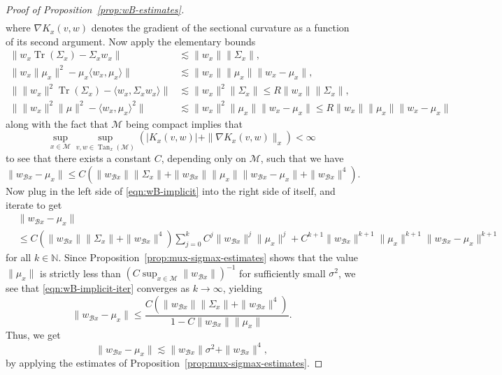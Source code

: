 \documentclass[preprint]{imsart}
\theoremstyle{plain}
\theoremstyle{definition}
\newcommand{\Nbb}{\mathbb{N}}
\newcommand{\Mcal}{\mathcal{M}}
\newcommand{\trace}{\operatorname{Tr}}
\DeclareMathOperator{\Tan}{Tan}
\newcommand{\B}{\mathcal{B}}
\begin{document}
\begin{appendix}
\begin{proof}[Proof of Proposition~\ref{prop:wB-estimates}]
\begin{align*}
    \end{align*}
    where $\nabla K_x(v,w)$ denotes the gradient of the sectional curvature as a function of its second argument.
    Now apply the elementary bounds
    \begin{align*}
        \bigg\|w_x\trace(\Sigma_x) - \Sigma_x w_x\bigg\| &\lesssim \|w_x\|\|\Sigma_x\|, \\
        \bigg\|w_x\|\mu_x\|^2 - \mu_x\langle w_x,\mu_x\rangle\bigg\| &\lesssim \|w_x\|\|\mu_x\|\|w_x-\mu_x\|, \\
        \bigg\|\|w_x\|^2\trace(\Sigma_x) - \langle w_x,\Sigma_x w_x\rangle\bigg\| &\lesssim \|w_x\|^2\|\Sigma_x\| \le R\|w_x\|\|\Sigma_x\|, \\
        \bigg\|\|w_x\|^2\|\mu\|^2-\langle w_x,\mu_x\rangle^2\bigg\| &\lesssim \|w_x\|^2\|\mu_x\|\|w_x-\mu_x\| \le R\|w_x\|\|\mu_x\|\|w_x-\mu_x\| 
    \end{align*}
    along with the fact that $\Mcal$ being compact implies that
    \begin{equation*}
        \sup_{x\in\Mcal}\sup_{v,w\in\Tan_x(\Mcal)}\left(|K_x(v,w)| + \|\nabla K_x(v,w)\|_x\right) <\infty
    \end{equation*}
    to see that there exists a constant $C$, depending only on $\Mcal$, such that we have
    \begin{equation}\label{eqn:wB-implicit}
        \|w_{\B x}-\mu_x\| \le C\left(\|w_{\B x}\|\|\Sigma_x\| + \|w_{\B x}\| \|\mu_x\|\|w_{\B x} - \mu_x\| + \|w_{\B x}\|^4\right).
    \end{equation}
    Now plug in the left side of \eqref{eqn:wB-implicit} into the right side of itself, and iterate to get
    \begin{equation}\label{eqn:wB-implicit-iter}
        \begin{split}
            &\|w_{\B x}-\mu_x\| \\
            &\le C\left(\|w_{\B x}\|\|\Sigma_x\|+\|w_{\B x}\|^4\right)\sum_{j=0}^{k}C^j\|w_{\B x}\|^j\|\mu_x\|^j+ C^{k+1}\|w_{\B x}\|^{k+1}\|\mu_x\|^{k+1} \|w_{\B x}-\mu_x\|^{k+1}
        \end{split}
    \end{equation}
    for all $k\in\Nbb$.
    Since Proposition~\ref{prop:mux-sigmax-estimates} shows that the value $\|\mu_x\|$ is strictly less than $(C\sup_{x\in\Mcal}\|w_{\B x}\|)^{-1}$ for sufficiently small $\sigma^2$, we see that \eqref{eqn:wB-implicit-iter} converges as $k\to\infty$, yielding
    \begin{equation*}
        \|w_{\B x}-\mu_x\| \le \frac{C\left(\|w_{\B x}\|\|\Sigma_x\| + \|w_{\B x}\|^4\right)}{1-C\|w_{\B x}\|\|\mu_x\|}.
    \end{equation*}
    Thus, we get
    \begin{equation}\label{eqn:wB-explicit}
        \|w_{\B x}-\mu_x\| \lesssim \|w_{\B x}\|\sigma^2 + \|w_{\B x}\|^4,
    \end{equation}
    by applying the estimates of Proposition~\ref{prop:mux-sigmax-estimates}.


\end{proof}
\end{appendix}
\end{document}
